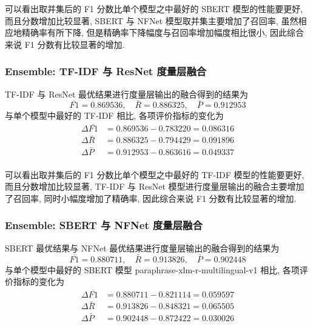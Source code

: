 \documentclass[12pt]{article}
\begin{document}
可以看出取并集后的 F1 分数比单个模型之中最好的 SBERT 模型的性能要更好, 而且分数增加比较显著, SBERT 与 NFNet 模型取并集主要增加了召回率, 虽然相应地精确率有所下降, 但是精确率下降幅度与召回率增加幅度相比很小, 因此综合来说 F1 分数有比较显著的增加.

\subsubsection{Ensemble: TF-IDF 与 ResNet 度量层融合}

TF-IDF 与 ResNet 最优结果进行度量层输出的融合得到的结果为
\begin{equation}
  \overline{F1}=0.869536,\quad\bar{R}=0.886325,\quad\bar{P}=0.912953
\end{equation}
与单个模型中最好的 TF-IDF 相比, 各项评价指标的变化为
\begin{equation}
  \begin{aligned}
    \Delta\overline{F1}&=0.869536-0.783220=0.086316\\
    \Delta\bar{R}&=0.886325-0.794429=0.091896\\
    \Delta\bar{P}&=0.912953-0.863616=0.049337\\
  \end{aligned}
\end{equation}

可以看出取并集后的 F1 分数比单个模型之中最好的 TF-IDF 模型的性能要更好, 而且分数增加比较显著, TF-IDF 与 ResNet 模型进行度量层输出的融合主要增加了召回率, 同时小幅度增加了精确率, 因此综合来说 F1 分数有比较显著的增加.

\subsubsection{Ensemble: SBERT 与 NFNet 度量层融合}

SBERT 最优结果与 NFNet 最优结果进行度量层输出的融合得到的结果为
\begin{equation}
  \overline{F1}=0.880711,\quad\bar{R}=0.913826,\quad\bar{P}=0.902448
\end{equation}
与单个模型中最好的 SBERT 模型 paraphrase-xlm-r-multilingual-v1 相比, 各项评价指标的变化为
\begin{equation}
  \begin{aligned}
    \Delta\overline{F1}&=0.880711-0.821114=0.059597\\
    \Delta\bar{R}&=0.913826-0.848321=0.065505\\
    \Delta\bar{P}&=0.902448-0.872422=0.030026\\
  \end{aligned}
\end{equation}
\end{document}

